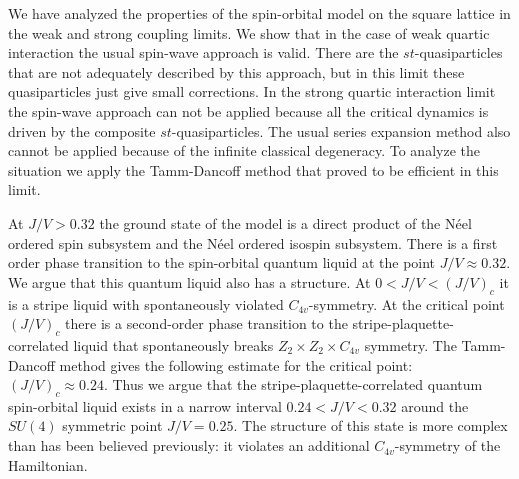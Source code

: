 We have analyzed the properties of the spin-orbital model on the square
lattice in the weak and
strong coupling limits. We show that in the case of weak quartic 
interaction the usual spin-wave approach is valid. There are the 
$st$-quasiparticles that are not adequately described by this approach,
but in this limit these quasiparticles just give small corrections.
In the strong quartic interaction limit the spin-wave approach can
not be applied because all the critical dynamics is driven by the
composite $st$-quasiparticles. The usual series expansion method also
cannot be applied because of the infinite classical degeneracy.
To analyze the situation we apply the Tamm-Dancoff method that proved
to be efficient in this limit.

At $J/V > 0.32$ the ground state of the model is a direct product
of the N\'eel ordered spin subsystem and the N\'eel ordered isospin subsystem.
There is a first order phase transition to the spin-orbital quantum liquid
at the point $J/V \approx 0.32$. We argue that this quantum liquid also 
has a structure.  At $0< J/V < (J/V)_c$ it is a stripe liquid with
spontaneously violated $C_{4v}$-symmetry. At the critical point 
$(J/V)_c$ there is a second-order phase transition to the 
stripe-plaquette-correlated liquid that spontaneously breaks
$Z_2 \times Z_2 \times C_{4v}$ symmetry. The Tamm-Dancoff method gives
the following estimate for the critical point: $(J/V)_c\approx 0.24$.
Thus we argue that the stripe-plaquette-correlated quantum spin-orbital
liquid exists in a narrow interval $0.24 < J/V < 0.32$ around the
$SU(4)$ symmetric point $J/V=0.25$. The structure of this state is
more complex than has been believed previously: it violates an additional
$C_{4v}$-symmetry of the Hamiltonian.


